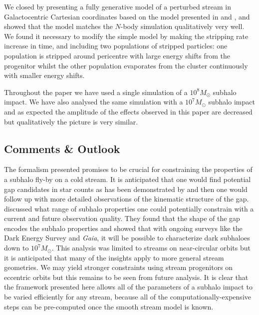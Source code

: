\documentclass[useAMS,usenatbib,fleqn,a4paper]{mn2e}
\begin{document}
We closed by presenting a fully generative model of a perturbed stream in Galactocentric Cartesian coordinates based on the model presented in \cite{Bovy2014} and \cite{Sanders2014}, and showed that the model matches the $N$-body simulation qualitatively very well. We found it necessary to modify the simple model by making the stripping rate increase in time, and including two populations of stripped particles: one population is stripped around pericentre with large energy shifts from the progenitor whilst the other population evaporates from the cluster continuously with smaller energy shifts.

Throughout the paper we have used a single simulation of a $10^8M_\odot$ subhalo impact. We have also analysed the same simulation with a $10^7M_\odot$ subhalo impact and as expected the amplitude of the effects observed in this paper are decreased but qualitatively the picture is very similar.

\subsection{Comments \& Outlook}

The formalism presented promises to be crucial for constraining the properties of a subhalo fly-by on a cold stream. It is anticipated that one would find potential gap candidates in star counts as has been demonstrated by \cite{CarlbergPal52012,CarlbergGD12013} and then one would follow up with more detailed observations of the kinematic structure of the gap. \cite{ErkalBelokurov2015b} discussed what range of subhalo properties one could potentially constrain with a current and future observation quality. They found that the shape of the gap encodes the subhalo properties and showed that with ongoing surveys like the Dark Energy Survey and \textit{Gaia}, it will be possible to characterize dark subhaloes down to $10^7M_\odot$. This analysis was limited to streams on near-circular orbits but it is anticipated that many of the insights apply to more general stream geometries. We may yield stronger constraints using stream progenitors on eccentric orbits but this remains to be seen from future analysis. It is clear that the framework presented here allows all of the parameters of a subhalo impact to be varied efficiently for any stream, because all of the computationally-expensive steps can be pre-computed once the smooth stream model is known.
\end{document}

